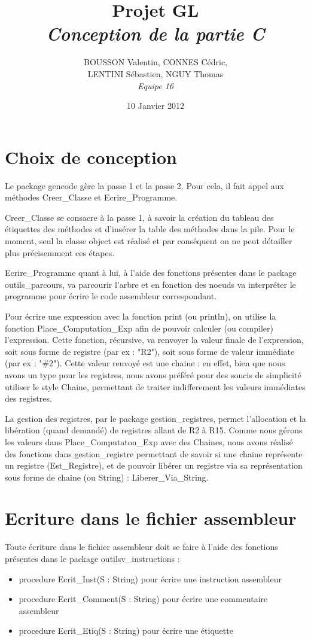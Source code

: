 \documentclass[11pt]{article}
\title{Projet GL\\\emph{Conception de la partie C}}
\author{BOUSSON Valentin, CONNES Cédric,\\LENTINI Sébastien, NGUY Thomas\\\emph{Equipe 16}}
\date{10 Janvier 2012}
\begin{document}
\maketitle

\section{Choix de conception}
Le package gencode gère la passe 1 et la passe 2. Pour cela, il fait appel aux méthodes 
Creer\_Classe et Ecrire\_Programme.

Creer\_Classe se consacre à la passe 1, à savoir la création du tableau des étiquettes des méthodes et d'insérer la table des méthodes dans la pile.
Pour le moment, seul la classe object est réalisé et par conséquent on ne peut détailler plus précisemment ces étapes.

Ecrire\_Programme quant à lui, à l'aide des fonctions présentes dans le package outils\_parcours, va parcourir l'arbre et en fonction des noeuds va interpréter le programme pour écrire le code assembleur correspondant.

Pour écrire une expression avec la fonction print (ou println), on utilise la fonction Place\_Computation\_Exp afin de pouvoir calculer (ou compiler) l'expression. Cette fonction, récursive, va renvoyer la valeur finale de l'expression, soit sous forme de registre (par ex : "R2"), soit sous forme de valeur immédiate (par ex : "\#2"). Cette valeur renvoyé est une chaine : en effet, bien que nous avons un type pour les registres, nous avons préféré pour des soucis de simplicité utiliser le style Chaine, permettant de traiter indifferement les valeurs immédiates des registres.

La gestion des registres, par le package gestion\_registres, permet l'allocation et la libération (quand demandé) de registres allant de R2 à R15. Comme nous gérons les valeurs dans Place\_Computaton\_Exp avec des Chaines, nous avons réalisé des fonctions dans gestion\_registre permettant de savoir si une chaine représente un registre (Est\_Registre), et de pouvoir libérer un registre via sa représentation sous forme de chaine (ou String) : Liberer\_Via\_String.


\section{Ecriture dans le fichier assembleur}
Toute écriture dans le fichier assembleur doit se faire à l'aide des fonctions 
présentes dans le package outilsv\_instructions : 
\begin{itemize}
\item procedure Ecrit\_Inst(S : String) pour écrire une instruction assembleur
\item procedure Ecrit\_Comment(S : String) pour écrire une commentaire assembleur
\item procedure Ecrit\_Etiq(S : String) pour écrire une étiquette
\end{itemize}
\end{document}
